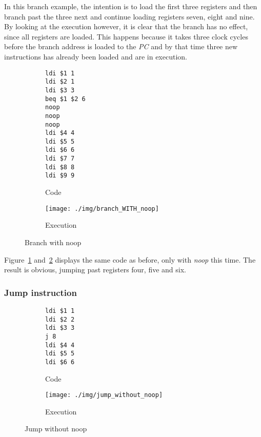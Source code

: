 In this branch example, the intention is to load the first three registers and then branch past the three next and continue loading registers seven, eight and nine. By looking at the execution however, it is clear that the branch has no effect, since all registers are loaded. This happens because it takes three clock cycles before the branch address is loaded to the \emph{PC} and by that time three new instructions has already been loaded and are in execution.
\\
\begin{figure}[H]
	\begin{subfigure}[b]{.5\linewidth}
		\begin{lstlisting}[language={[mips]Assembler}]
ldi $1 1
ldi $2 1
ldi $3 3
beq $1 $2 6
noop
noop
noop
ldi $4 4
ldi $5 5
ldi $6 6
ldi $7 7
ldi $8 8
ldi $9 9
		\end{lstlisting}
		\caption{Code}
		\label{code:branch_with_noop}
	\end{subfigure}
	\begin{subfigure}[b]{.5\linewidth}
		\centering
		\texttt{[image: ./img/branch\_WITH\_noop]}
		\caption{Execution}
		\label{img:branch_with_noop}
	\end{subfigure}
	\caption{Branch with noop}
	\label{branch_with_noop}
\end{figure}

Figure~\ref{code:branch_with_noop} and~\ref{img:branch_with_noop} displays the same code as before, only with \emph{noop} this time. The result is obvious, jumping past registers four, five and six.
\\

\subsubsection{Jump instruction} %
\label{subsub:jump_instruction}

\begin{figure}[H]
	\begin{subfigure}[b]{.5\linewidth}
		\begin{lstlisting}[language={[mips]Assembler}]
ldi $1 1
ldi $2 2
ldi $3 3
j 8
ldi $4 4
ldi $5 5
ldi $6 6
		\end{lstlisting}
		\caption{Code}
		\label{code:jump_without_noop}
	\end{subfigure}
	\begin{subfigure}[b]{.5\linewidth}
		\centering
		\texttt{[image: ./img/jump\_without\_noop]}
		\caption{Execution}
		\label{img:jump_without_noop}
	\end{subfigure}
	\caption{Jump without noop}
	\label{jump_without_noop}
\end{figure}

